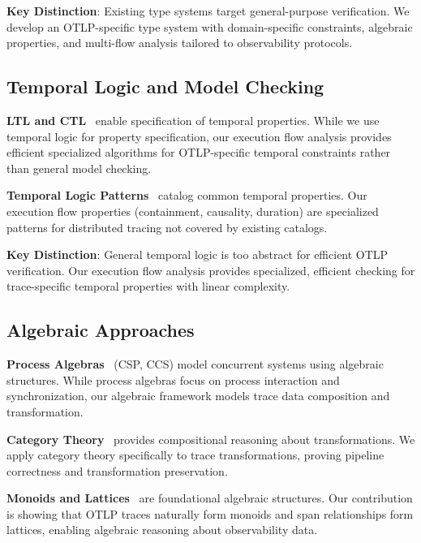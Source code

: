 \textbf{Key Distinction}: Existing type systems target general-purpose verification. We develop an OTLP-specific type system with domain-specific constraints, algebraic properties, and multi-flow analysis tailored to observability protocols.

\subsection{Temporal Logic and Model Checking}
\label{sec:related-temporal}

\textbf{LTL and CTL}~\cite{pnueli1977temporal,emerson1986sometimes} enable specification of temporal properties. While we use temporal logic for property specification, our execution flow analysis provides efficient specialized algorithms for OTLP-specific temporal constraints rather than general model checking.

\textbf{Temporal Logic Patterns}~\cite{dwyer1999patterns} catalog common temporal properties. Our execution flow properties (containment, causality, duration) are specialized patterns for distributed tracing not covered by existing catalogs.

\textbf{Key Distinction}: General temporal logic is too abstract for efficient OTLP verification. Our execution flow analysis provides specialized, efficient checking for trace-specific temporal properties with linear complexity.

\subsection{Algebraic Approaches}
\label{sec:related-algebraic}

\textbf{Process Algebras}~\cite{hoare1978csp,milner1980ccs} (CSP, CCS) model concurrent systems using algebraic structures. While process algebras focus on process interaction and synchronization, our algebraic framework models trace data composition and transformation.

\textbf{Category Theory}~\cite{maclane1998categories,awodey2010category} provides compositional reasoning about transformations. We apply category theory specifically to trace transformations, proving pipeline correctness and transformation preservation.

\textbf{Monoids and Lattices}~\cite{birkhoff1940lattice} are foundational algebraic structures. Our contribution is showing that OTLP traces naturally form monoids and span relationships form lattices, enabling algebraic reasoning about observability data.


